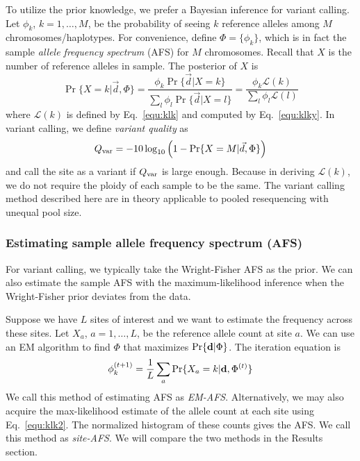 \documentclass{bioinfo}
\begin{document}
\begin{methods}
To utilize the prior knowledge, we prefer a Bayesian inference for variant calling.
Let $\phi_k$, $k=1,\ldots,M$, be the probability of seeing $k$ reference alleles
among $M$ chromosomes/haplotypes. For convenience, define $\Phi=\{\phi_k\}$, which
is in fact the sample \emph{allele frequency spectrum} (AFS) for $M$ chromosomes. Recall
that $X$ is the number of reference alleles in sample. The posterior of $X$ is
$$
\Pr\{X=k|\vec{d},\Phi\}=\frac{\phi_k\Pr\{\vec{d}|X=k\}}{\sum_l\phi_l\Pr\{\vec{d}|X=l\}}
=\frac{\phi_k\mathcal{L}(k)}{\sum_l\phi_l\mathcal{L}(l)}
$$
where $\mathcal{L}(k)$ is defined by Eq.~\eqref{equ:klk} and computed by Eq.~\eqref{equ:klky}.
In variant calling, we define \emph{variant quality} as
$$
Q_{\rm var}=-10\log_{10}\Big(1-\Pr\{X=M|\vec{d},\Phi\}\Big)
$$
and call the site as a variant if $Q_{\rm var}$ is large enough. Because in deriving
$\mathcal{L}(k)$, we do not require the ploidy of each sample to be the same. The
variant calling method described here are in theory applicable to pooled resequencing with unequal pool size.

\subsubsection{Estimating sample allele frequency spectrum (AFS)}
For variant calling, we typically take the Wright-Fisher AFS as the prior. We can also
estimate the sample AFS with the maximum-likelihood inference when the Wright-Fisher prior
deviates from the data.

Suppose we have $L$ sites of interest and we want to estimate the frequency across these sites.
Let $X_a$, $a=1,\ldots,L$, be the reference allele count at site $a$. We can use an EM algorithm
to find $\Phi$ that maximizes $\Pr\{{\bf d}|\Phi\}$. The iteration equation is
\begin{equation}\label{eq:afs}
\phi_k^{(t+1)}=\frac{1}{L}\sum_a\Pr\{X_a=k|{\bf d},\Phi^{(t)}\}
\end{equation}
We call this method of estimating AFS as \emph{EM-AFS}. Alternatively, we may also acquire the max-likelihood
estimate of the allele count at each site using Eq.~\eqref{equ:klk2}. The normalized histogram of these counts
gives the AFS. We call this method as \emph{site-AFS}. We will compare the two methods in the Results section.


\end{methods}
\end{document}
